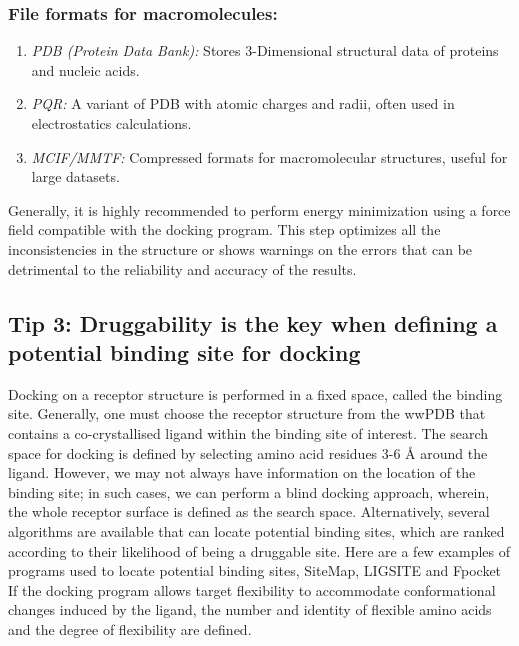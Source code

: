 \documentclass[10pt,letterpaper]{article}
\begin{document}
{{\subsubsection*{File formats for macromolecules:}
    \begin{enumerate}
        \item \textit{PDB (Protein Data Bank):} Stores 3-Dimensional structural data of proteins and nucleic acids. 
	       \item \textit{PQR:} A variant of PDB with atomic charges and radii, often used in electrostatics calculations.
	       \item \textit{MCIF/MMTF:} Compressed formats for macromolecular structures, useful for large datasets. 
    \end{enumerate}


Generally, it is highly recommended to perform energy minimization using a force field compatible with the docking program. This step optimizes all the inconsistencies in the structure or shows warnings on the errors that can be detrimental to the reliability and accuracy of the results. 

\subsection*{Tip 3: Druggability is the key when defining a potential binding site for docking}

Docking on a receptor structure is performed in a fixed space, called the binding site. Generally, one must choose the receptor structure from the wwPDB that contains a co-crystallised ligand within the binding site of interest. The search space for docking is defined by selecting amino acid residues 3-6 \r{A} around the ligand.  However, we may not always have information on the location of the binding site; in such cases, we can perform a blind docking approach, wherein, the whole receptor surface is defined as the search space. Alternatively, several algorithms are available that can locate potential binding sites, which are ranked according to their likelihood of being a druggable site. Here are a few examples of programs used to locate potential binding sites, SiteMap\cite{bib7}, LIGSITE \cite{bib8} and Fpocket\cite{bib9} If the docking program allows target flexibility to accommodate conformational changes induced by the ligand, the number and identity of flexible amino acids and the degree of flexibility are defined. 
    
}}
\end{document}
